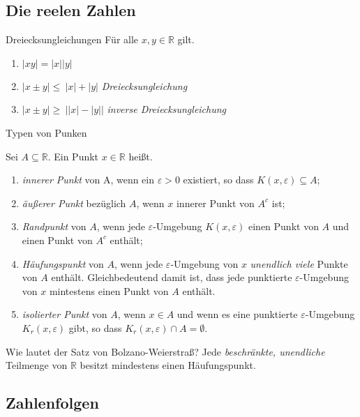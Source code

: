 \subsection{Die reelen Zahlen}

\begin{karte}{Dreiecksungleichungen}
	Für alle \(x,y \in \mathbb{R}\) gilt.
	\begin{enumerate}[label=\(\triangleright \)]
		\item \(\lvert xy    \rvert =      		\lvert x\rvert    \lvert y\rvert  \)
		\item \(\lvert x\pm y\rvert \leq\  		\lvert x\rvert +  \lvert y\rvert  \)  \dotfill \emph{Dreiecksungleichung}
		\item \(\lvert x\pm y\rvert \geq\ \lvert\lvert x\rvert -  \lvert y\rvert\rvert \)  \dotfill \emph{inverse Dreiecksungleichung}
		      
		      
	\end{enumerate}
\end{karte}

\begin{karte}{Typen von Punken}
	{\large
		Sei \(A \subseteq \mathbb{R}\). Ein Punkt \(x \in \mathbb{R}\) heißt.
		\begin{enumerate}[label=$\triangleright$]
			\item \emph{innerer Punkt} von A, wenn ein \(\varepsilon > 0\) existiert, so dass \(K(x,\varepsilon) 		\subseteq A\);
			\item \emph{äußerer Punkt} bezüglich \(A\), wenn \(x\) innerer Punkt von \(A^c\) ist;
			\item \emph{Randpunkt} von \(A\), wenn  jede \(\varepsilon \)-Umgebung \(K(x,\varepsilon)\) einen Punkt von \(A\) und einen Punkt von \(A^c\) enthält;
			\item \emph{Häufungspunkt} von \(A\), wenn jede \(\varepsilon \)-Umgebung von \( x \) \emph{unendlich viele} Punkte von \(A\) enthält. Gleichbedeutend damit ist, dass jede punktierte \(\varepsilon \)-Umgebung von \(x\) mintestens einen Punkt von \(A\) enthält.
			\item \emph{isolierter Punkt} von \(A\), wenn \(x \in A \) und  wenn es eine punktierte \(\varepsilon \)-Umgebung \(K_{r}(x,\varepsilon)\) gibt, so dass \(K_{r}(x,\varepsilon) \cap A = \emptyset \).
			      
		\end{enumerate}
	}
	
\end{karte}


\begin{karte}{Wie lautet der Satz von Bolzano-Weierstraß?}
	Jede \emph{beschränkte, unendliche} Teilmenge von \(\mathbb{R}\) besitzt mindestens einen Häufungspunkt.
\end{karte}
\subsection{Zahlenfolgen}
